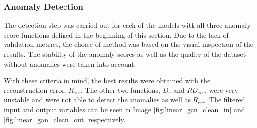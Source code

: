 \subsubsection*{Anomaly Detection}
The detection step was carried out for each of the models with all three anomaly score functions defined in the beginning of this section. Due to the lack of validation metrics, the choice of method was based on the visual inspection of the results. The stability of the anomaly scores as well as the quality of the dataset without anomalies were taken into account.

With these criteria in mind, the best results were obtained with the reconstruction error, $R_{err}$. The other two functions, $D_{s}$ and $RD_{err}$, were very unstable and were not able to detect the anomalies as well as $R_{err}$. The filtered input and output variables can be seen in Image \ref{fig:linear_gan_clean_in} and \ref{fig:linear_gan_clean_out} respectively.


